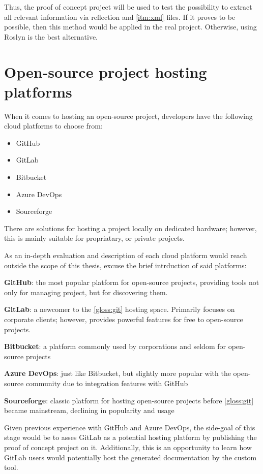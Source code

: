 Thus, the proof of concept project will be used to test the possibility to extract all relevant information via reflection and \ref{itm:xml} files. If it proves to be possible, then this method would be applied in the real project. Otherwise, using Roslyn is the best alternative.

\section{Open-source project hosting platforms}
When it comes to hosting an open-source project, developers have the following cloud platforms to choose from:
\begin{itemize}
    \item GitHub
    \item GitLab
    \item Bitbucket
    \item Azure DevOps
    \item Sourceforge
\end{itemize}

There are solutions for hosting a project locally on dedicated hardware; however, this is mainly suitable for propriatary, or private projects.

As an in-depth evaluation and description of each cloud platform would reach outside the scope of this thesis, excuse the brief intrduction of said platforms:

\textbf{GitHub}: the most popular platform for open-source projects, providing tools not only for managing project, but for discovering them.

\textbf{GitLab}: a newcomer to the \ref{gloss:git} hosting space. Primarily focuses on corporate clients; however, provides powerful features for free to open-source projects.

\textbf{Bitbucket}: a platform commonly used by corporations and seldom for open-source projects

\textbf{Azure DevOps}: just like Bitbucket, but slightly more popular with the open-source community due to integration features with GitHub

\textbf{Sourceforge}: classic platform for hosting open-source projects before \ref{gloss:git} became mainstream, declining in popularity and usage

Given previous experience with GitHub and Azure DevOps, the side-goal of this stage would be to asses GitLab as a potential hosting platform by publishing the proof of concept project on it. Additionally, this is an opportunity to learn how GitLab users would potentially host the generated documentation by the custom tool.

